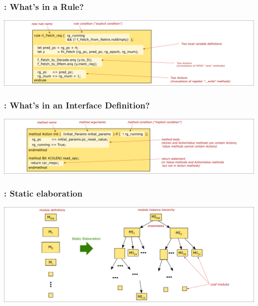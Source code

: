 \begin{frame}
\frametitle{{\BSV}: What's in a Rule?}

\begin{center}
\includegraphics[width=\textwidth]{../Figures/Fig_BSV_whats_in_a_rule}
\end{center}

\end{frame}


\begin{frame}
\frametitle{{\BSV}: What's in an Interface Definition?}

\begin{center}
\includegraphics[width=\textwidth]{../Figures/Fig_BSV_whats_in_an_interface_def}
\end{center}

\end{frame}


\begin{frame}
\frametitle{{\BSV}: Static elaboration}

\begin{center}
\includegraphics[width=\textwidth]{../Figures/Fig_BSV_static_elaboration}
\end{center}

\end{frame}

